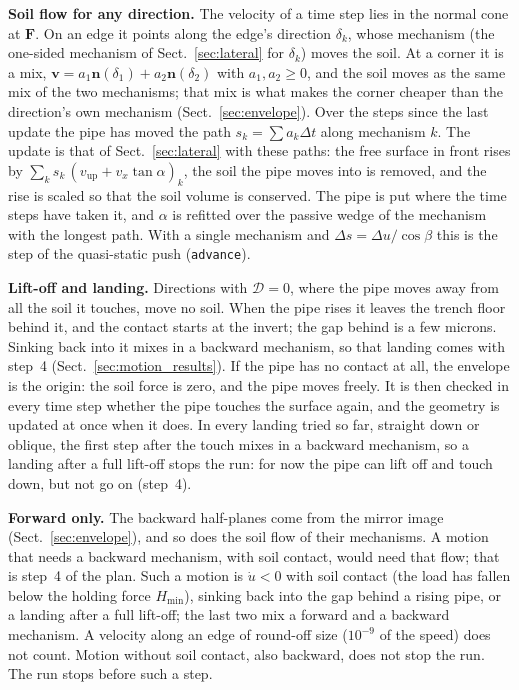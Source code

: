 \documentclass[11pt,a4paper]{article}
\begin{document}
\textbf{Soil flow for any direction.}  The velocity of a time step lies
in the normal cone at $\mathbf{F}$.  On an edge it points along the
edge's direction $\delta_k$, whose mechanism (the one-sided mechanism
of Sect.~\ref{sec:lateral} for $\delta_k$) moves the soil.  At a corner
it is a mix,
$\mathbf{v} = a_1\mathbf{n}(\delta_1) + a_2\mathbf{n}(\delta_2)$ with
$a_1, a_2 \ge 0$, and the soil moves as the same mix of the two
mechanisms; that mix is what makes the corner cheaper than the
direction's own mechanism (Sect.~\ref{sec:envelope}).  Over the steps
since the last update the pipe has moved the path
$s_k = \sum a_k\Delta t$ along mechanism $k$.  The update is that of
Sect.~\ref{sec:lateral} with these paths: the free surface in front
rises by $\sum_k s_k\,(v_\text{up} + v_x\tan\alpha)_k$, the soil the
pipe moves into is removed, and the rise is scaled so that the soil
volume is conserved.  The pipe is put where the time steps have taken
it, and $\alpha$ is refitted over the passive wedge of the mechanism
with the longest path.  With a single mechanism and
$\Delta s = \Delta u/\cos\beta$ this is the step of the quasi-static
push (\texttt{advance}).

\textbf{Lift-off and landing.}  Directions with $\mathcal{D} = 0$,
where the pipe moves away from all the soil it touches, move no soil.
When the pipe rises it leaves the trench floor behind it, and the
contact starts at the invert; the gap behind is a few microns.  Sinking
back into it mixes in a backward mechanism, so that landing comes with
step~4 (Sect.~\ref{sec:motion_results}).  If the pipe has no contact
at all, the envelope is the origin: the soil force is zero, and the
pipe moves freely.  It is then checked in every time step whether the
pipe touches the surface again, and the geometry is updated at once
when it does.  In every landing tried so far, straight down or
oblique, the first step after the touch mixes in a backward mechanism,
so a landing after a full lift-off stops the run: for now the pipe can
lift off and touch down, but not go on (step~4).

\textbf{Forward only.}  The backward half-planes come from the mirror
image (Sect.~\ref{sec:envelope}), and so does the soil flow of their
mechanisms.  A motion that needs a backward mechanism, with soil
contact, would need that flow; that is step~4 of the plan.  Such a
motion is $\dot u < 0$ with soil contact (the load has fallen below the
holding force $H_\text{min}$), sinking back into the gap behind a
rising pipe, or a landing after a full lift-off; the last two mix a
forward and a backward mechanism.  A velocity along an edge of
round-off size ($10^{-9}$ of the speed) does not count.  Motion without
soil contact, also backward, does not stop the run.  The run stops
before such a step.
\end{document}
